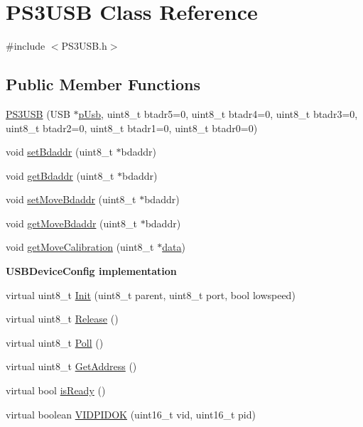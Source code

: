 \hypertarget{class_p_s3_u_s_b}{\section{\-P\-S3\-U\-S\-B \-Class \-Reference}
\label{class_p_s3_u_s_b}
}


{\ttfamily \#include $<$\-P\-S3\-U\-S\-B.\-h$>$}

\subsection*{\-Public \-Member \-Functions}
\begin{DoxyCompactItemize}
\item 
\hyperlink{class_p_s3_u_s_b_ac919404d4caf4625467756272f8d5502}{\-P\-S3\-U\-S\-B} (\-U\-S\-B $\ast$\hyperlink{class_p_s3_u_s_b_aa1873f41ae0da7c4568cfb7517560c48}{p\-Usb}, uint8\-\_\-t btadr5=0, uint8\-\_\-t btadr4=0, uint8\-\_\-t btadr3=0, uint8\-\_\-t btadr2=0, uint8\-\_\-t btadr1=0, uint8\-\_\-t btadr0=0)
\item 
void \hyperlink{class_p_s3_u_s_b_ad50962ff6194746c076084ec0714605a}{set\-Bdaddr} (uint8\-\_\-t $\ast$bdaddr)
\item 
void \hyperlink{class_p_s3_u_s_b_a1448bc51226a9b63f2937630da6bd48f}{get\-Bdaddr} (uint8\-\_\-t $\ast$bdaddr)
\item 
void \hyperlink{class_p_s3_u_s_b_a3fccc7ef5ac5c414ef8ebcd2e2cdfc80}{set\-Move\-Bdaddr} (uint8\-\_\-t $\ast$bdaddr)
\item 
void \hyperlink{class_p_s3_u_s_b_a6c722086999db05d8abf5f1f26c19f77}{get\-Move\-Bdaddr} (uint8\-\_\-t $\ast$bdaddr)
\item 
void \hyperlink{class_p_s3_u_s_b_ab6e97f59f4a62e52cf54cdd302679cd9}{get\-Move\-Calibration} (uint8\-\_\-t $\ast$\hyperlink{masstorage_8h_afb87d045bbf32b236fc425efe02bdc7b}{data})
\end{DoxyCompactItemize}
\begin{Indent}{\bf \-U\-S\-B\-Device\-Config implementation}\par
\begin{DoxyCompactItemize}
\item 
virtual uint8\-\_\-t \hyperlink{class_p_s3_u_s_b_a0083545cb99fb8786e60281fe7a9050d}{\-Init} (uint8\-\_\-t parent, uint8\-\_\-t port, bool lowspeed)
\item 
virtual uint8\-\_\-t \hyperlink{class_p_s3_u_s_b_a5750c5448bf1ec73a7669ca2e4799c98}{\-Release} ()
\item 
virtual uint8\-\_\-t \hyperlink{class_p_s3_u_s_b_a9068e2a036012614c0db163830cbcf00}{\-Poll} ()
\item 
virtual uint8\-\_\-t \hyperlink{class_p_s3_u_s_b_a04b79c271ca14e1e095c6e305c672627}{\-Get\-Address} ()
\item 
virtual bool \hyperlink{class_p_s3_u_s_b_a02a5b0244665d5a790d1020e51c94479}{is\-Ready} ()
\item 
virtual boolean \hyperlink{class_p_s3_u_s_b_ababb6cbf8297581b27400f9a39d75e5a}{\-V\-I\-D\-P\-I\-D\-O\-K} (uint16\-\_\-t vid, uint16\-\_\-t pid)
\end{DoxyCompactItemize}
\end{Indent}
